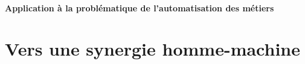 




\subsection{Application à la problématique de l'automatisation des métiers}

\part{Vers une synergie homme-machine}